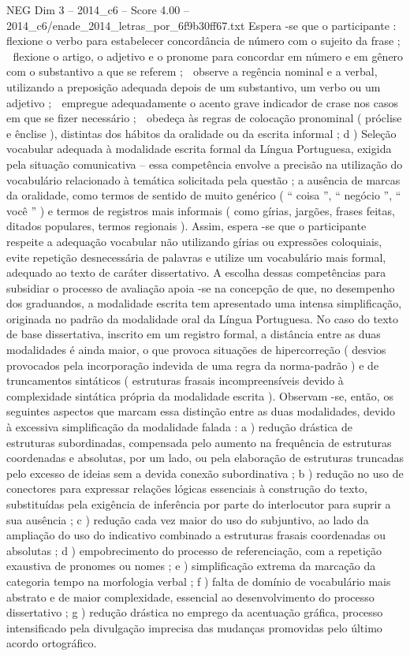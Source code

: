 \begin{textsample}{NEG Dim 3 – 2014\_c6 – Score 4.00 – 2014\_c6/enade\_2014\_letras\_por\_6f9b30ff67.txt}
Espera -se que o participante :  flexione o verbo para estabelecer concordância de número com o sujeito da frase ;  flexione o artigo, o adjetivo e o pronome para concordar em número e em gênero com o substantivo a que se referem ;  observe a regência nominal e a verbal, utilizando a preposição adequada depois de um substantivo, um verbo ou um adjetivo ;  empregue adequadamente o acento grave indicador de crase nos casos em que se fizer necessário ;  obedeça às regras de colocação pronominal ( próclise e ênclise ), distintas dos hábitos da oralidade ou da escrita informal ; d ) Seleção vocabular adequada à modalidade escrita formal da Língua Portuguesa, exigida pela situação comunicativa – essa competência envolve a precisão na utilização do vocabulário relacionado à temática solicitada pela questão ; a ausência de marcas da oralidade, como termos de sentido de muito genérico ( “ coisa ”, “ negócio ”, “ você ” ) e termos de registros mais informais ( como gírias, jargões, frases feitas, ditados populares, termos regionais ).
Assim, espera -se que o participante respeite a adequação vocabular não utilizando gírias ou expressões coloquiais, evite repetição desnecessária de palavras e utilize um vocabulário mais formal, adequado ao texto de caráter dissertativo.
A escolha dessas competências para subsidiar o processo de avaliação apoia -se na concepção de que, no desempenho dos graduandos, a modalidade escrita tem apresentado uma intensa simplificação, originada no padrão da modalidade oral da Língua Portuguesa.
No caso do texto de base dissertativa, inscrito em um registro formal, a distância entre as duas modalidades é ainda maior, o que provoca situações de hipercorreção ( desvios provocados pela incorporação indevida de uma regra da norma-padrão ) e de truncamentos sintáticos ( estruturas frasais incompreensíveis devido à complexidade sintática própria da modalidade escrita ).
Observam -se, então, os seguintes aspectos que marcam essa distinção entre as duas modalidades, devido à excessiva simplificação da modalidade falada : a ) redução drástica de estruturas subordinadas, compensada pelo aumento na frequência de estruturas coordenadas e absolutas, por um lado, ou pela elaboração de estruturas truncadas pelo excesso de ideias sem a devida conexão subordinativa ; b ) redução no uso de conectores para expressar relações lógicas essenciais à construção do texto, substituídas pela exigência de inferência por parte do interlocutor para suprir a sua ausência ; c ) redução cada vez maior do uso do subjuntivo, ao lado da ampliação do uso do indicativo combinado a estruturas frasais coordenadas ou absolutas ; d ) empobrecimento do processo de referenciação, com a repetição exaustiva de pronomes ou nomes ; e ) simplificação extrema da marcação da categoria tempo na morfologia verbal ; f ) falta de domínio de vocabulário mais abstrato e de maior complexidade, essencial ao desenvolvimento do processo dissertativo ; g ) redução drástica no emprego da acentuação gráfica, processo intensificado pela divulgação imprecisa das mudanças promovidas pelo último acordo ortográfico.

\end{textsample}
